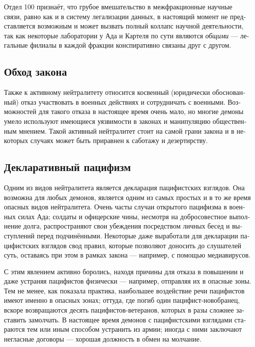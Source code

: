 \documentclass[a4paper,12pt,fleqn]{book}\usepackage{cooltooltips}\usepackage{polyglossia}\setdefaultlanguage[babelshorthands=true]{russian}\setotherlanguage{english}\defaultfontfeatures{Ligatures=TeX,Mapping=tex-text} \usepackage{xcolor}\definecolor{lightgray}{HTML}{bbbbbb}\color{lightgray}\newcommand{\ml}[3]{\textenglish{\textcolor{black}{#3}}}
\begin{document}
{Отдел 100 признаёт, что грубое вмешательство в межфракционные научные связи, равно как и в систему легализации данных, в настоящий момент не представляется возможным и может вызвать полный коллапс научной деятельности, так как некоторые лаборатории у Ада и Картеля по сути являются \emph{общими} --- легальные филиалы в каждой фракции конспиративно связаны друг с другом.

\subsection{Обход закона}

Также к активному нейтралитету относится косвенный (юридически обоснованный) отказ участвовать в военных действиях и сотрудничать с военными.
Возможностей для такого отказа в настоящее время очень мало, но многие демоны умело используют имеющиеся уязвимости в законах и манипуляцию общественным мнением.
Такой активный нейтралитет стоит на самой грани закона и в некоторых случаях может быть приравнен к саботажу и дезертирству.

\subsection{Декларативный пацифизм}

Одним из видов нейтралитета является декларация пацифистских взглядов.
Она возможна для любых демонов, является одним из самых простых и в то же время опасных видов нейтралитета.
Очень часты случаи открытого пацифизма в военных силах Ада;
солдаты и офицерские чины, несмотря на добросовестное выполнение долга, распространяют свои убеждения посредством личных бесед и выступлений перед подчинёнными.
Некоторые даже выработали для декларации пацифистских взглядов свод правил, которые позволяют доносить до слушателей суть, оставаясь при этом в рамках закона --- например, с помощью медиавирусов.

С этим явлением активно боролись, находя причины для отказа в повышении и даже устраняя пацифистов физически --- например, отправляя их в опасные зоны.
Тем не менее, как показала практика, наибольшее воздействие речи пацифистов имеют именно в опасных зонах;
оттуда, где погиб один пацифист-новобранец, вскоре возвращаются десять пацифистов-ветеранов, которых в разы сложнее заставить замолчать.
В настоящее время демонов с пацифистскими взглядами стараются тем или иным способом устранить из армии;
иногда с ними заключают негласные договоры --- хорошая должность в обмен на молчание.

}
\end{document}
